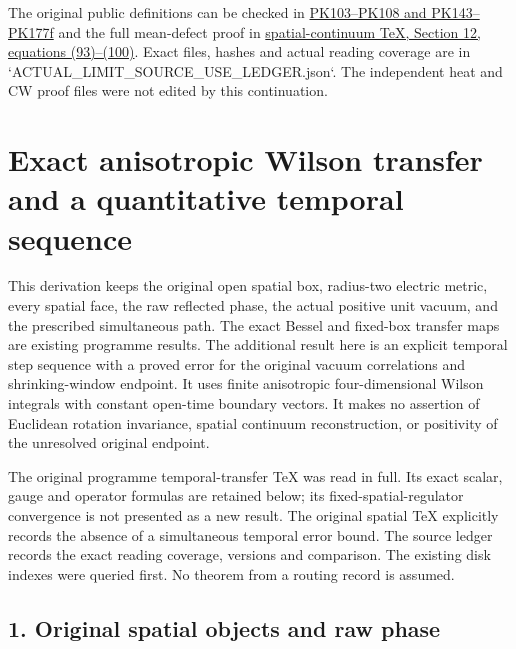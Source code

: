 \documentclass[11pt]{article}
\begin{document}
The original public definitions can be checked in
\href{https://github.com/KokunoYumeto/yang-mills-interacting-workbench/blob/485b61423c1f4e1805deb453c1b6b342b27842b6/yang-mills/continuations/20260930-s6-ns-moment-map-bridge/PERIOD_COUPLING_AND_PHYSICAL_KERNELS.md}{PK103–PK108 and PK143–PK177f}
and the full mean-defect proof in
\href{https://github.com/KokunoYumeto/yang-mills-interacting-workbench/blob/485b61423c1f4e1805deb453c1b6b342b27842b6/yang-mills/continuations/20260930-s6-ns-moment-map-bridge/sources/spatial/spatial_continuum.tex}{spatial-continuum TeX, Section 12, equations (93)–(100)}.
Exact files, hashes and actual reading coverage are in
`ACTUAL\_LIMIT\_SOURCE\_USE\_LEDGER.json`. The independent heat and CW proof files were
not edited by this continuation.
\clearpage
\section*{Exact anisotropic Wilson transfer and a quantitative temporal sequence}

This derivation keeps the original open spatial box, radius-two electric metric, every spatial face, the raw reflected phase, the actual positive unit vacuum, and the prescribed simultaneous path. The exact Bessel and fixed-box transfer maps are existing programme results. The additional result here is an explicit temporal step sequence with a proved error for the original vacuum correlations and shrinking-window endpoint. It uses finite anisotropic four-dimensional Wilson integrals with constant open-time boundary vectors. It makes no assertion of Euclidean rotation invariance, spatial continuum reconstruction, or positivity of the unresolved original endpoint.

The original programme temporal-transfer TeX was read in full. Its exact scalar, gauge and operator formulas are retained below; its fixed-spatial-regulator convergence is not presented as a new result. The original spatial TeX explicitly records the absence of a simultaneous temporal error bound. The source ledger records the exact reading coverage, versions and comparison. The existing disk indexes were queried first. No theorem from a routing record is assumed.

\subsection*{1. Original spatial objects and raw phase}
\end{document}
